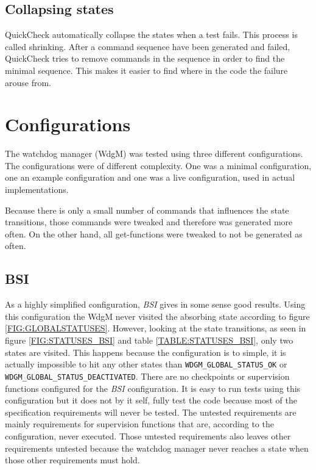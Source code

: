 \subsection{Collapsing states}
QuickCheck automatically collapse the states when a test fails. This
process is called shrinking. After a command sequence have been
generated and failed, QuickCheck tries to remove commands in the
sequence in order to find the minimal sequence. This makes it easier
to find where in the code the failure arouse from.

\section{Configurations}
The watchdog manager (WdgM) was tested using three different
configurations. The configurations were of different complexity. One
was a minimal configuration, one an example configuration and one was
a live configuration, used in actual implementations.

Because there is only a small number of commands that influences the
state transitions, those commands were tweaked and therefore was
generated more often. On the other hand, all get-functions were
tweaked to not be generated as often.

\subsection{BSI}
As a highly simplified configuration, \emph{BSI} gives in some sense
good results.  Using this configuration the WdgM never visited the
absorbing state according to figure \ref{FIG:GLOBALSTATUSES}. However,
looking at the state transitions, as seen in figure
\ref{FIG:STATUSES_BSI} and table \ref{TABLE:STATUSES_BSI}, only two
states are visited. This happens because the configuration is to
simple, it is actually impossible to hit any other states than
\lstinline!WDGM_GLOBAL_STATUS_OK! or
\lstinline!WDGM_GLOBAL_STATUS_DEACTIVATED!. There are no checkpoints
or supervision functions configured for the \emph{BSI} configuration.
It is easy to run tests using this configuration but it does not by it
self, fully test the code because most of the specification
requirements will never be tested. The untested requirements are
mainly requirements for supervision functions that are, according to
the configuration, never executed. Those untested requirements also
leaves other requirements untested because the watchdog manager never
reaches a state when those other requirements must hold.

